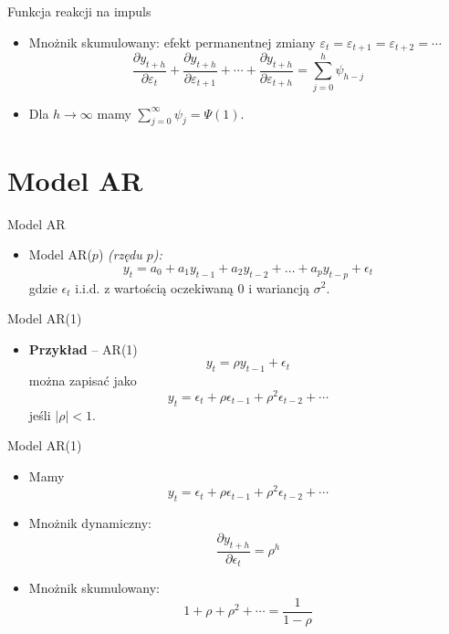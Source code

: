 \documentclass[11pt,usenames,dvipsnames,aspectratio=169]{beamer}
\begin{document}
\begin{frame}{Funkcja reakcji na impuls}
\begin{itemize}
    \item Mnożnik skumulowany: efekt permanentnej zmiany $\varepsilon_{t}=\varepsilon_{t+1}=\varepsilon_{t+2}=\cdots$
    \[
    \frac{\partial y_{t+h}}{\partial \varepsilon_{t}}+\frac{\partial y_{t+h}}{\partial \varepsilon_{t+1}}+\cdots+\frac{\partial y_{t+h}}{\partial \varepsilon_{t+h}}=\sum_{j=0}^{h}\psi_{h-j}
    \]
    \item Dla $h\rightarrow\infty$ mamy $\sum_{j=0}^{\infty}\psi_{j}=\Psi(1)$.
\end{itemize}
\end{frame}

\section{Model AR}

\begin{frame}{Model AR}
\begin{itemize}
    \item Model AR($p$) \emph{(rzędu $p$):}
    \[
    y_{t}=a_{0}+a_{1}y_{t-1}+a_{2}y_{t-2}+\ldots+a_{p}y_{t-p}+\epsilon_{t}
    \]
    gdzie $\epsilon_{t}$ i.i.d. z wartością oczekiwaną $0$ i wariancją $\sigma^{2}$.
\end{itemize}
\end{frame}

\begin{frame}{Model AR(1)}
\begin{itemize}
    \item \textbf{Przykład} -- AR(1)
    \[
    y_{t}=\rho y_{t-1}+\epsilon_{t}
    \]
    można zapisać jako
    \[
    y_{t}=\epsilon_{t}+\rho\epsilon_{t-1}+\rho^{2}\epsilon_{t-2}+\cdots
    \]
    jeśli $|\rho|<1$.
\end{itemize}
\end{frame}

\begin{frame}{Model AR(1)}
\begin{itemize}
    \item Mamy
    \[
    y_{t}=\epsilon_{t}+\rho\epsilon_{t-1}+\rho^{2}\epsilon_{t-2}+\cdots
    \]
    \item Mnożnik dynamiczny:
    \[
    \frac{\partial y_{t+h}}{\partial \epsilon_{t}}=\rho^{h}
    \]
    \item Mnożnik skumulowany:
    \[
    1+\rho+\rho^{2}+\cdots=\frac{1}{1-\rho}
    \]
\end{itemize}
\end{frame}
\end{document}
